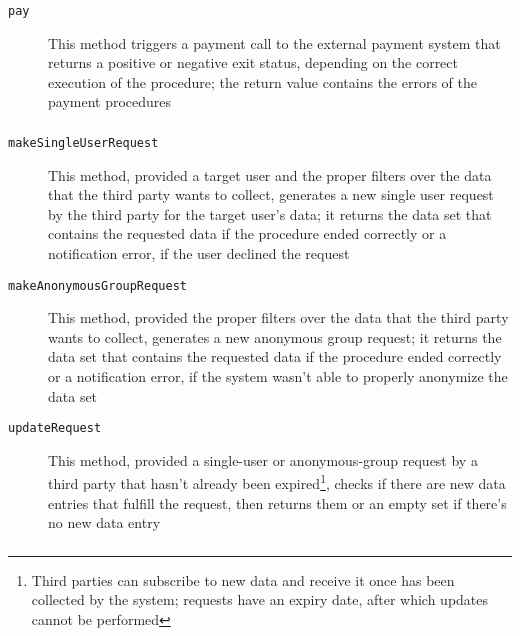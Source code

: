 \documentclass[../DD0.tex]{subfiles}
\begin{document}
    \subsubsection{\PaymentGateway}

      \begin{description}
        \item[\texttt{pay}] This method triggers a payment call to the external payment system that returns a positive or negative exit status, depending on the correct execution of the procedure; the return value contains the errors of the payment procedures
      \end{description}

    \subsubsection{\RequestManager}

      \begin{description}
        \item[\texttt{makeSingleUserRequest}] This method, provided a target user and the proper filters over the data that the third party wants to collect, generates a new single user request by the third party for the target user's data; it returns the data set that contains the requested data if the procedure ended correctly or a notification error, if the user declined the request

        \item[\texttt{makeAnonymousGroupRequest}] This method, provided the proper filters over the data that the third party wants to collect, generates a new anonymous group request; it returns the data set that contains the requested data if the procedure ended correctly or a notification error, if the system wasn't able to properly anonymize the data set

        \item[\texttt{updateRequest}] This method, provided a single-user or anonymous-group request by a third party that hasn't already been expired\footnote{Third parties can subscribe to new data and receive it once has been collected by the system; requests have an expiry date, after which updates cannot be performed}, checks if there are new data entries that fulfill the request, then returns them or an empty set if there's no new data entry
      \end{description}

    \subsubsection{\SetBuilder}
\end{document}
